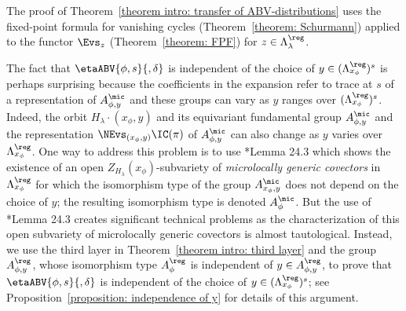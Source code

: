 \documentclass[11pt,letterpaper]{amsart}
\numberwithin{equation}{section}
\begin{document}
The proof of Theorem~\ref{theorem intro: transfer of ABV-distributions} uses the fixed-point formula for vanishing cycles (Theorem~\ref{theorem: Schurmann}) applied to the functor $\Evs_z$ (Theorem~\ref{theorem: FPF}) for $z\in \Lambda_\lambda^\reg$.

The fact that $\etaABV{\phi,s}{,\delta}$ is independent of the choice of $y\in (\Lambda^\reg_{x_\phi})^s$ is perhaps surprising because the coefficients in the expansion refer to trace at $s$ of a representation of $A^\mic_{\phi,y}$ and these groups can vary as $y$ ranges over $(\Lambda^\reg_{x_\phi})^s$.
Indeed, the orbit $H_\lambda\cdot(x_\phi,y)$ and its equivariant fundamental group $A^\mic_{\phi,y}$ and the representation $\NEvs_{(x_\phi,y)}\IC(\pi)$ of $A^\mic_{\phi,y}$ can also change as $y$ varies over $\Lambda_{x_\phi}^\reg$.
One way to address this problem is to use \cite{ABV92}*{Lemma 24.3} which shows the existence of an open $Z_{H_\lambda}(x_\phi)$-subvariety of {\it microlocally generic covectors} in $\Lambda^\reg_{x_\phi}$ for which the isomorphism type of the group $A^\mic_{x_\phi,y}$ does not depend on the choice of $y$; the resulting isomorphism type is denoted $A^\mic_\phi$. But the use of \cite{ABV92}*{Lemma 24.3} creates significant technical problems as the characterization of this open subvariety of microlocally generic covectors is almost tautological. 
Instead, we use the third layer in Theorem~\ref{theorem intro: third layer} and the group $A^\reg_{\phi,y}$, whose isomorphism type $A^\reg_{\phi}$ is independent of $y\in A^\reg_{\phi,y}$, to prove that $\etaABV{\phi,s}{,\delta}$ is independent of the choice of $y\in (\Lambda^\reg_{x_\phi})^s$; see Proposition~\ref{proposition: independence of y} for details of this argument.
\end{document}

